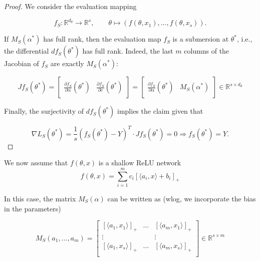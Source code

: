 \documentclass{article}
\newcommand{\RR}{\mathbb{R}}
\begin{document}
\begin{proof} We consider the evaluation mapping

\begin{equation}
f_S: \RR^{d_\theta} \rightarrow \RR^{s}, \qquad \theta \mapsto (f(\theta,x_1),\ldots,f(\theta,x_s)).
\end{equation}

If $M_S(\alpha^*)$ has full rank, then the evaluation map $f_S$ is a
submersion at $\theta^*$, i.e., the differential $df_S (\theta^*)$
has full rank. Indeed, the last $m$ columns of the Jacobian of $f_S$
are exactly $M_S(\alpha^*)$:

\begin{equation}
J f_S(\theta^*) = \begin{bmatrix} \frac{\partial f_S}{\partial \alpha}(\theta^*) & \frac{\partial f_S}{\partial c}(\theta^*)\end{bmatrix} = 
\begin{bmatrix} \frac{\partial f_S}{\partial \alpha}(\theta^*) & M_S(\alpha^*) \end{bmatrix} \in \RR^{s \times d_{\theta}}
\end{equation}

Finally, the surjectivity of $d f_S(\theta^*)$ implies the claim given
that

\begin{equation}
\nabla L_S(\theta^*) = \frac 1 s (f_S(\theta^*) - Y)^T \cdot J f_S(\theta^*)  = 0 \Rightarrow f_S(\theta^*) = Y.\end{equation}
\end{proof}

We now assume that $f(\theta,x)$ is a shallow ReLU network
\begin{equation}
f(\theta,x) = \sum_{i=1}^m c_i [\langle a_i,x \rangle + b_i]_+
\end{equation}

In this case, the matrix $M_S(\alpha)$ can be written as (wlog, we
incorporate the bias in the parameters)

\begin{equation}
M_S(a_1,\ldots,a_m) = \begin{bmatrix}
[\langle a_1, x_1 \rangle]_+ & \ldots & [\langle a_m, x_1 \rangle]_+\\
\vdots & & \vdots \\
[\langle a_1, x_s \rangle]_+ & \ldots & [\langle a_m, x_s \rangle]_+\\
\end{bmatrix} \in \RR^{s \times m}
\end{equation}
\end{document}
